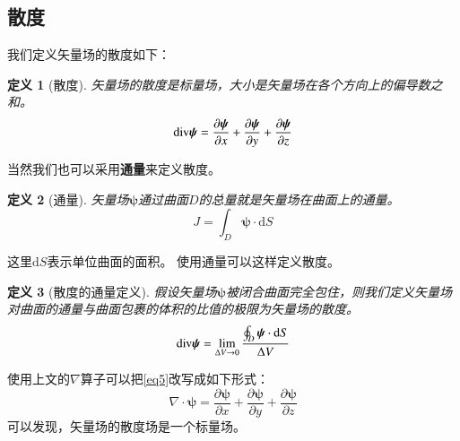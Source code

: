 \documentclass[12pt,a4paper]{ctexart}
\newtheorem{definition}{\indent 定义}[section]
\renewcommand*{\bf}[1]{\boldsymbol{#1}}
\renewcommand*{\div}{\textbf{\rm{div}}}
\renewcommand*{\d}{\mathrm{d}}
\numberwithin{equation}{section}
\begin{document}
            \subsection{散度}
            我们定义矢量场的散度如下：
            \begin{definition}[散度]
                矢量场的散度是标量场，大小是矢量场在各个方向上的偏导数之和。
                \begin{equation*}
                    \div \bf{\psi} = \frac{\partial \bf{\psi}}{\partial x} + \frac{\partial \bf{\psi}}{\partial y} + \frac{\partial \bf{\psi}}{\partial z} \label{eq4}
                \end{equation*}
            \end{definition}
            当然我们也可以采用\textbf{通量}来定义散度。
            \begin{definition}[通量]
                矢量场$\bf{\psi}$通过曲面$D$的总量就是矢量场在曲面上的通量。
                \begin{equation}
                    J = \int_{D} \bf{\psi} \cdot \d S \label{eq5}
                \end{equation}
            \end{definition}
            这里$\d S$表示单位曲面的面积。
            使用通量可以这样定义散度。
            \begin{definition}[散度的通量定义]
                假设矢量场$\bf{\psi}$被闭合曲面完全包住，则我们定义矢量场对曲面的通量与曲面包裹的体积的比值的极限为矢量场的散度。
                \begin{equation}
                    \div \bf{\psi} = \lim_{\Delta V \to 0} \frac{ \oint_{D} \bf{\psi} \cdot \d S }{\Delta V} \label{eq6}
                \end{equation}
            \end{definition}
            使用上文的$\nabla$算子可以把\ref{eq5}改写成如下形式：
            \begin{equation}
                \nabla \cdot \bf{\psi} = \frac{\partial \bf{\psi}}{\partial x} + \frac{\partial \bf{\psi}}{\partial y} + \frac{\partial \bf{\psi}}{\partial z} \label{eq7}
            \end{equation}
            可以发现，矢量场的散度场是一个标量场。
\end{document}
